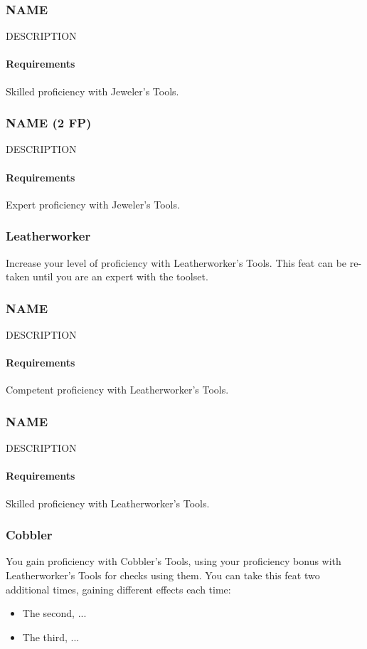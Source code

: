 \subsubsection{NAME} \label{feat::name}
    DESCRIPTION
    \paragraph{Requirements} Skilled proficiency with Jeweler's Tools.
\subsubsection{NAME (2 FP)} \label{feat::name}
    DESCRIPTION
    \paragraph{Requirements} Expert proficiency with Jeweler's Tools.
\subsubsection{Leatherworker} \label{feat::leatherworker}
    Increase your level of proficiency with Leatherworker's Tools.
    This feat can be re-taken until you are an expert with the toolset.
\subsubsection{NAME} \label{feat::name}
    DESCRIPTION
    \paragraph{Requirements} Competent proficiency with Leatherworker's Tools.
\subsubsection{NAME} \label{feat::name}
    DESCRIPTION
    \paragraph{Requirements} Skilled proficiency with Leatherworker's Tools.
\subsubsection{Cobbler} \label{feat::cobbler}
    You gain proficiency with Cobbler's Tools, using your proficiency bonus with Leatherworker's Tools for checks using them.
    You can take this feat two additional times, gaining different effects each time:
    \begin{itemize}
        \item The second, ...
        \item The third, ...
    \end{itemize}
